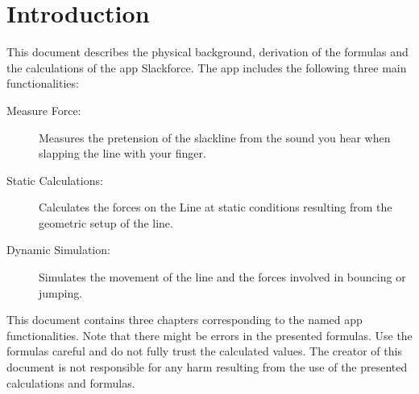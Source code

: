 \chapter{Introduction}

This document describes the physical background, derivation of the formulas and the calculations of the app Slackforce. The app includes the following three main functionalities:

\begin{description}
	\item[Measure Force:] Measures the pretension of the slackline from the sound you hear when slapping the line with your finger.
	\item[Static Calculations:] Calculates the forces on the Line at static conditions resulting from the geometric setup of the line.
	\item[Dynamic Simulation:] Simulates the movement of the line and the forces involved in bouncing or jumping.
\end{description}

This document contains three chapters corresponding to the named app functionalities. Note that there might be errors in the presented formulas. Use the formulas careful and do not fully trust the calculated values. The creator of this document is not responsible for any harm resulting from the use of the presented calculations and formulas.